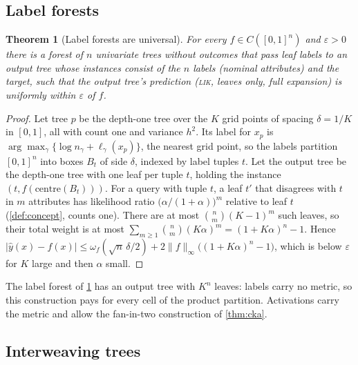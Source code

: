\documentclass[11pt]{article}
\newtheorem{theorem}{Theorem}
\theoremstyle{definition}
\theoremstyle{remark}
\newcommand{\hy}{\hat{y}}
\begin{document}
\subsection{Label forests}

\begin{theorem}[Label forests are universal]\label{thm:label}
For every $f\in C([0,1]^n)$ and $\varepsilon>0$ there is a forest of $n$ univariate trees
without outcomes that pass leaf labels to an output tree whose instances consist of the
$n$ labels (nominal attributes) and the target, such that the output tree's prediction
(\textsc{lik}, leaves only, full expansion) is uniformly within $\varepsilon$ of $f$.
\end{theorem}
\begin{proof}
Let tree $p$ be the depth-one tree over the $K$ grid points of spacing $\delta=1/K$ in
$[0,1]$, all with count one and variance $h^2$.  Its label for $x_p$ is
$\arg\max_\gamma\{\log n_\gamma+\ell_\gamma(x_p)\}$, the nearest grid point, so the
labels partition $[0,1]^n$ into boxes $B_t$ of side $\delta$, indexed by label tuples
$t$.  Let the output tree be the depth-one tree with one leaf per tuple $t$, holding the
instance $(t,f(\text{centre}(B_t)))$.  For a query with tuple $t$, a leaf $t'$ that
disagrees with $t$ in $m$ attributes has likelihood ratio $\bigl(\alpha/(1+\alpha)\bigr)^m$
relative to leaf $t$ (\cref{def:concept}, counts one).  There are at most
$\binom nm(K-1)^m$ such leaves, so their total weight is at most
$\sum_{m\ge1}\binom nm(K\alpha)^m=(1+K\alpha)^n-1$.  Hence
$|\hy(x)-f(x)|\le\omega_f(\sqrt n\,\delta/2)+2\|f\|_\infty\bigl((1+K\alpha)^n-1\bigr)$,
which is below $\varepsilon$ for $K$ large and then $\alpha$ small.
\end{proof}

The label forest of \cref{thm:label} has an output tree with $K^n$ leaves: labels carry
no metric, so this construction pays for every cell of the product partition.
Activations carry the metric and allow the fan-in-two construction of \cref{thm:cka}.

\subsection{Interweaving trees}
\end{document}
